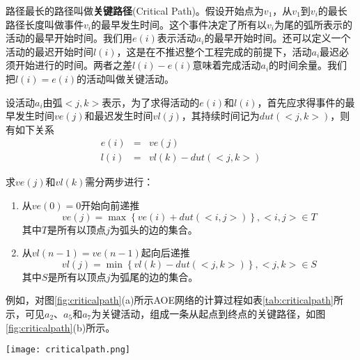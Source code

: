 路径最长的路径叫做\textbf{关键路径}(Critical Path)。假设开始点为$v_1$，从$v_1$到$v_i$的最长路径长度叫做事件$v_i$的最早发生时间。这个事件决定了所有以$v_i$为尾的弧所表示的活动的最早开始时间。我们用$e(i)$表示活动$a_i$的最早开始时间。还可以定义一个活动的最迟开始时间$l(i)$，这是在不推迟整个工程完成的前提下，活动$a_i$最迟必须开始进行的时间。两者之差$l(i)-e(i)$意味着完成活动$a_i$的时间余量。我们把$l(i)=e(i)$的活动叫做关键活动。

设活动$a_i$由弧$<j, k>$表示，为了求得活动的$e(i)$和$l(i)$，首先应求得事件的最早发生时间$ve(j)$和最迟发生时间$vl(j)$，其持续时间记为$dut(<j, k>)$，则有如下关系
\begin{eqnarray}
e(i) &=& ve(j) \nonumber \\
l(i) &=& vl(k)-dut(<j, k>) \nonumber
\end{eqnarray}

求$ve(j)$和$vl(k)$需分两步进行：
\begin{enumerate}
\item 从$ve(0)=0$开始向前递推
$$
ve(j)=\max\left\{ve(i)+dut(<i, j>)\right\}, <i, j> \in T
$$
其中$T$是所有以顶点$j$为弧头的边的集合。
\item 从$vl(n-1)=ve(n-1)$起向后递推
$$
vl(j)=\min\left\{vl(k)-dut(<j, k>)\right\}, <j, k> \in S
$$
其中$S$是所有以顶点$j$为弧尾的边的集合。
\end{enumerate}

例如，对图\ref{fig:criticalpath}(a)所示AOE网络的计算过程如表\ref{tab:criticalpath}所示，可见$a_2$、$a_5$和$a_7$为关键活动，组成一条从起点到终点的关键路径，如图\ref{fig:criticalpath}(b)所示。

\begin{center}
\texttt{[image: criticalpath.png]}\\
\label{fig:criticalpath}
\end{center}

